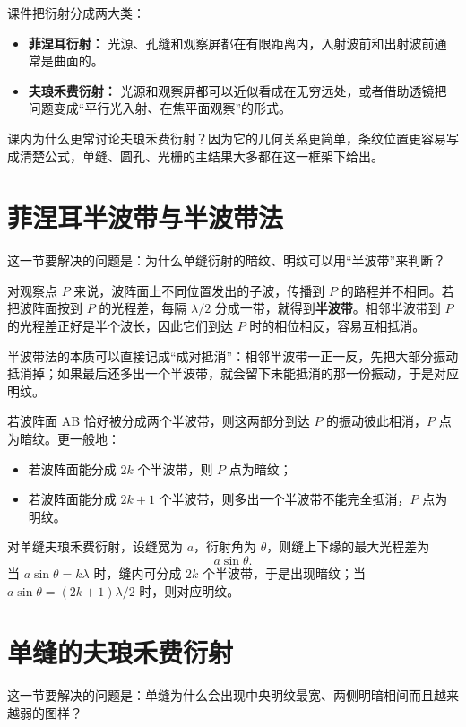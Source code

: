 \documentclass[lang=cn,11pt]{elegantbook}
\newcommand{\bridge}[1]{\begin{note}#1\end{note}}
\begin{document}
课件把衍射分成两大类：
\begin{itemize}
  \item \textbf{菲涅耳衍射：} 光源、孔缝和观察屏都在有限距离内，入射波前和出射波前通常是曲面的。
  \item \textbf{夫琅禾费衍射：} 光源和观察屏都可以近似看成在无穷远处，或者借助透镜把问题变成“平行光入射、在焦平面观察”的形式。
\end{itemize}

\begin{note}
课内为什么更常讨论夫琅禾费衍射？因为它的几何关系更简单，条纹位置更容易写成清楚公式，单缝、圆孔、光栅的主结果大多都在这一框架下给出。
\end{note}

\section{菲涅耳半波带与半波带法}

这一节要解决的问题是：为什么单缝衍射的暗纹、明纹可以用“半波带”来判断？

对观察点 \(P\) 来说，波阵面上不同位置发出的子波，传播到 \(P\) 的路程并不相同。若把波阵面按到 \(P\) 的光程差，每隔 \(\lambda/2\) 分成一带，就得到\textbf{半波带}。相邻半波带到 \(P\) 的光程差正好是半个波长，因此它们到达 \(P\) 时的相位相反，容易互相抵消。

\bridge{半波带法的本质可以直接记成“成对抵消”：相邻半波带一正一反，先把大部分振动抵消掉；如果最后还多出一个半波带，就会留下未能抵消的那一份振动，于是对应明纹。}

若波阵面 AB 恰好被分成两个半波带，则这两部分到达 \(P\) 的振动彼此相消，\(P\) 点为暗纹。更一般地：
\begin{itemize}
  \item 若波阵面能分成 \(2k\) 个半波带，则 \(P\) 点为暗纹；
  \item 若波阵面能分成 \(2k+1\) 个半波带，则多出一个半波带不能完全抵消，\(P\) 点为明纹。
\end{itemize}

对单缝夫琅禾费衍射，设缝宽为 \(a\)，衍射角为 \(\theta\)，则缝上下缘的最大光程差为
\[
a\sin\theta.
\]
当 \(a\sin\theta=k\lambda\) 时，缝内可分成 \(2k\) 个半波带，于是出现暗纹；当 \(a\sin\theta=(2k+1)\lambda/2\) 时，则对应明纹。

\section{单缝的夫琅禾费衍射}

这一节要解决的问题是：单缝为什么会出现中央明纹最宽、两侧明暗相间而且越来越弱的图样？
\end{document}
